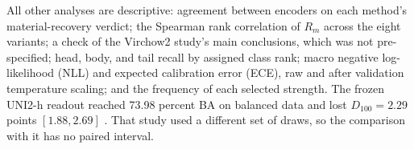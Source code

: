 \documentclass[11pt]{article}
\begin{document}
All other analyses are descriptive: agreement between encoders on each method's material-recovery verdict; the Spearman rank correlation of $R_m$ across the eight variants; a check of the Virchow2 study's main conclusions, which was not pre-specified; head, body, and tail recall by assigned class rank; macro negative log-likelihood (NLL) and expected calibration error (ECE), raw and after validation temperature scaling; and the frequency of each selected strength. The frozen UNI2-h readout reached 73.98 percent BA on balanced data and lost $D_{100}=2.29$ points $[1.88, 2.69]$ \citep{queisler2026encoderTransfer}. That study used a different set of draws, so the comparison with it has no paired interval.





\end{document}
